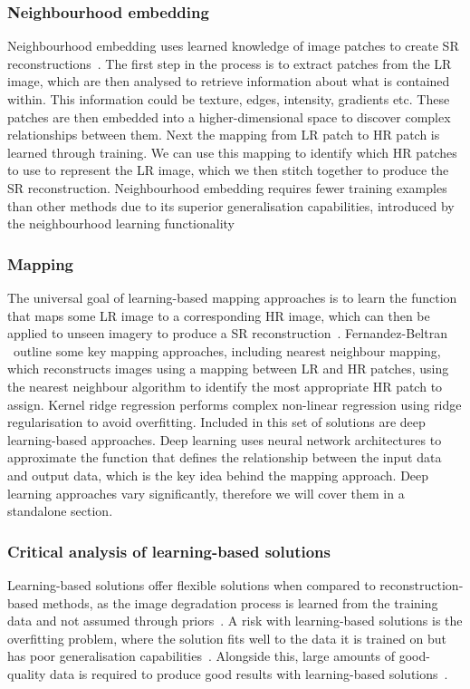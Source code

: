 \subsubsection{Neighbourhood embedding}
Neighbourhood embedding uses learned knowledge of image patches to create SR reconstructions~\cite{neighbourhoodEmbedding}. The first step in the process is to extract patches from the LR image, which are then analysed to retrieve information about what is contained within. This information could be texture, edges, intensity, gradients etc. These patches are then embedded into a higher-dimensional space to discover complex relationships between them. Next the mapping from LR patch to HR patch is learned through training. We can use this mapping to identify which HR patches to use to represent the LR image, which we then stitch together to produce the SR reconstruction. Neighbourhood embedding requires fewer training examples than other methods due to its superior generalisation capabilities, introduced by the neighbourhood learning functionality~\cite{neighbourhoodEmbedding}

\subsubsection{Mapping}
The universal goal of learning-based mapping approaches is to learn the function that maps some LR image to a corresponding HR image, which can then be applied to unseen imagery to produce a SR reconstruction~\cite{superResRemoteSensingOverview}. Fernandez-Beltran \etal\ outline some key mapping approaches, including nearest neighbour mapping, which reconstructs images using a mapping between LR and HR patches, using the nearest neighbour algorithm to identify the most appropriate HR patch to assign. Kernel ridge regression performs complex non-linear regression using ridge regularisation to avoid overfitting. Included in this set of solutions are deep learning-based approaches. Deep learning uses neural network architectures to approximate the function that defines the relationship between the input data and output data, which is the key idea behind the mapping approach. Deep learning approaches vary significantly, therefore we will cover them in a standalone section.

\subsubsection{Critical analysis of learning-based solutions}
Learning-based solutions offer flexible solutions when compared to reconstruction-based methods, as the image degradation process is learned from the training data and not assumed through priors~\cite{neighbourhoodEmbedding}. A risk with learning-based solutions is the overfitting problem, where the solution fits well to the data it is trained on but has poor generalisation capabilities~\cite{overfitting}. Alongside this, large amounts of good-quality data is required to produce good results with learning-based solutions~\cite{superResRemoteSensingOverview}.

